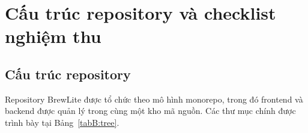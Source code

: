 

\section{Cấu trúc repository và checklist nghiệm thu}

\subsection{Cấu trúc repository}

Repository BrewLite được tổ chức theo mô hình monorepo, trong đó
frontend và backend được quản lý trong cùng một kho mã nguồn.
Các thư mục chính được trình bày tại Bảng~\ref{tabB:tree}.

